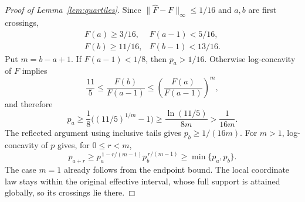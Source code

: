 \begin{proof}[Proof of Lemma~\ref{lem:quartiles}]
Since $\|\widehat F-F\|_\infty\leq1/16$ and $a,b$ are first crossings,
\[
\begin{array}{ll}
 F(a)\geq3/16, & F(a-1)<5/16,\\
 F(b)\geq11/16,& F(b-1)<13/16.
\end{array}
\]
Put $m=b-a+1$. If $F(a-1)<1/8$, then $p_a>1/16$.
Otherwise log-concavity of $F$ implies
\[
        \frac{11}{5}\leq\frac{F(b)}{F(a-1)}
                   \leq\left(\frac{F(a)}{F(a-1)}\right)^m,
\]
and therefore
\[
 p_a\geq\frac18\bigl((11/5)^{1/m}-1\bigr)
      \geq\frac{\ln(11/5)}{8m}>\frac1{16m}.
\]
The reflected argument using inclusive tails gives $p_b\geq1/(16m)$.
For $m>1$, log-concavity of $p$ gives, for $0\leq r<m$,
\[
 p_{a+r}\geq p_a^{\,1-r/(m-1)}p_b^{\,r/(m-1)}
           \geq\min\{p_a,p_b\}.
\]
The case $m=1$ already follows from the endpoint bound.
The local coordinate law stays within the original effective interval,
whose full support is attained globally, so its crossings lie there.
\end{proof}
